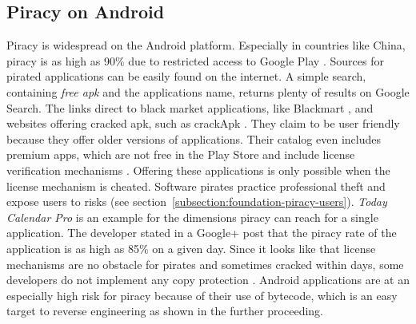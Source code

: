 \subsection{Piracy on Android} \label{subsection:foundation-piracy-android}
Piracy is widespread on the Android platform.
Especially in countries like China, piracy is as high as 90\% due to restricted access to Google Play \cite{piracyRate}.
Sources for pirated applications can be easily found on the internet.
A simple search, containing \textit{free apk} and the applications name, returns plenty of results on Google Search.
The links direct to black market applications, like Blackmart \cite{blackmartStore}, and websites offering cracked \gls{apk}, such as crackApk \cite{crackApk}.
They claim to be user friendly because they offer older versions of applications.
Their catalog even includes premium apps, which are not free in the Play Store and include license verification mechanisms \cite{apksfree}.
Offering these applications is only possible when the license mechanism is cheated.
Software pirates practice professional theft and expose users to risks (see section~\ref{subsection:foundation-piracy-users}).
\newline
\textit{Today Calendar Pro} is an example for the dimensions piracy can reach for a single application.
The developer stated in a Google+ post that the piracy rate of the application is as high as 85\% on a given day. \cite{xdaPiracy} \cite{developersPiracy}
Since it looks like that license mechanisms are no obstacle for pirates and sometimes cracked within days, some developers do not implement any copy protection \cite{recodeMonument}.
\newline
Android applications are at an especially high risk for piracy because of their use of bytecode, which is an easy target to reverse engineering as shown in the further proceeding.
